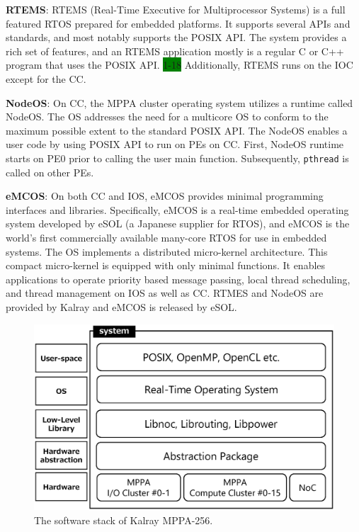 \documentclass[conference,compsoc]{IEEEtran}
\begin{document}
\textbf{RTEMS}: RTEMS (Real-Time Executive for Multiprocessor Systems) is a full featured RTOS prepared for embedded platforms.
It supports several APIs and standards, and most notably supports the POSIX API.
The system provides a rich set of features, and an RTEMS application mostly is a regular C or C++ program that uses the POSIX API.
\colorbox{green}{1-18}
Additionally, RTEMS runs on the IOC except for the CC.

\textbf{NodeOS}: On CC, the MPPA cluster operating system utilizes a runtime called NodeOS.
The OS addresses the need for a multicore OS to conform to the maximum possible extent to the standard POSIX API.
The NodeOS enables a user code by using POSIX API to run on PEs on CC.
First, NodeOS runtime starts on PE0 prior to calling the user main function.
Subsequently, \texttt{pthread} is called on other PEs.

\textbf{eMCOS}: On both CC and IOS, eMCOS provides minimal programming interfaces and libraries.
Specifically, eMCOS is a real-time embedded operating system developed by eSOL (a Japanese supplier for RTOS), and eMCOS is the world's first commercially available many-core RTOS for use in embedded systems.
The OS implements a distributed micro-kernel architecture.
This compact micro-kernel is equipped with only minimal functions.
It enables applications to operate priority based message passing, local thread scheduling, and thread management on IOS as well as CC.
RTMES and NodeOS are provided by Kalray and eMCOS is released by eSOL.

\begin{figure}[t]
  \centering
  \includegraphics[width=1.0\linewidth]{../figure/softwarestack.eps}
  \caption{\label{fig:software_stack}
    The software stack of Kalray MPPA-256.}
\end{figure}
\end{document}
